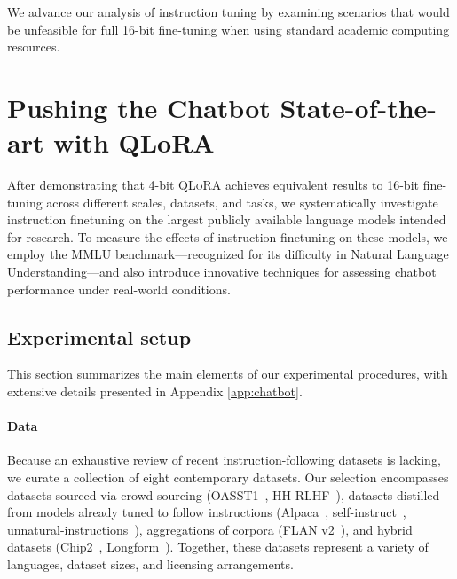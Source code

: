 We advance our analysis of instruction tuning by examining scenarios that would be unfeasible for full 16-bit fine-tuning when using standard academic computing resources.

\section{Pushing the Chatbot State-of-the-art with QLoRA}
\label{sec:pushing}
After demonstrating that 4-bit \textsc{QLoRA} achieves equivalent results to 16-bit fine-tuning across different scales, datasets, and tasks, we systematically investigate instruction finetuning on the largest publicly available language models intended for research. To measure the effects of instruction finetuning on these models, we employ the MMLU benchmark—recognized for its difficulty in Natural Language Understanding—and also introduce innovative techniques for assessing chatbot performance under real-world conditions.

\subsection{Experimental setup} This section summarizes the main elements of our experimental procedures, with extensive details presented in Appendix \ref{app:chatbot}.

\paragraph{Data} Because an exhaustive review of recent instruction-following datasets is lacking, we curate a collection of eight contemporary datasets. Our selection encompasses datasets sourced via crowd-sourcing (OASST1~\citep{kopf2023openassistant}, HH-RLHF~\citep{bai2022training}), datasets distilled from models already tuned to follow instructions (Alpaca~\citep{alpaca}, self-instruct~\citep{wang2022self}, unnatural-instructions~\citep{honovich2022unnatural}), aggregations of corpora (FLAN v2~\citep{chung2022scaling}), and hybrid datasets (Chip2~\citep{laion2023}, Longform~\citep{koksal2023longform}). Together, these datasets represent a variety of languages, dataset sizes, and licensing arrangements.

